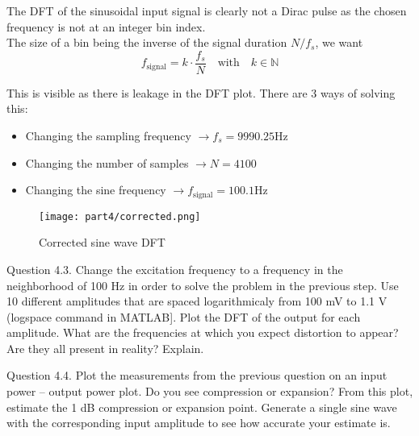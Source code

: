 The DFT of the sinusoidal input signal is clearly not a Dirac pulse as the chosen frequency is not at an integer bin index. \\

The size of a bin being the inverse of the signal duration $N/f_s$, we want
\begin{equation*}
    f_{\text{signal}} = k \cdot \frac{f_s}{N} \quad \text{with} \quad k \in \mathbb{N}
\end{equation*}

This is visible as there is leakage in the DFT plot. There are 3 ways of solving this:
\begin{itemize}
    \item Changing the sampling frequency $\rightarrow f_s = 9990.25 \text{Hz}$
    \item Changing the number of samples $\rightarrow N = 4100 $
    \item Changing the sine frequency $\rightarrow f_{\text{signal}} = 100.1 \text{Hz}$
\end{itemize}

\begin{figure}[H]
    \centering
    \texttt{[image: part4/corrected.png]}
    \caption{Corrected sine wave DFT}
    \label{fig:corrected}
\end{figure}


\begin{Task}{Question 4.3.}
    Change the excitation frequency to a frequency in the neighborhood of 100 Hz in order to solve the problem in the previous step. Use 10 different amplitudes that are spaced logarithmicaly from 100 mV to 1.1 V (logspace command in MATLAB]. Plot the DFT of the output for each amplitude. What are the frequencies at which you expect distortion to appear? Are they all present in reality? Explain.
\end{Task}

\begin{Task}{Question 4.4.}
    Plot the measurements from the previous question on an input power – output power plot. Do you see compression or expansion? From this plot, estimate the 1 dB compression or expansion point. Generate a single sine wave with the corresponding input amplitude to see how accurate your estimate is.
\end{Task}

